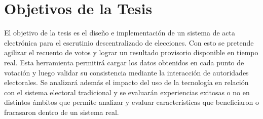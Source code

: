 \section{Objetivos de la Tesis}
El objetivo de la tesis es el diseño e implementación de un sistema de acta electrónica para el escrutinio descentralizado de elecciones. Con esto se pretende agilizar el recuento de votos y lograr un resultado provisorio disponible en tiempo real. Esta herramienta permitirá cargar los datos obtenidos en cada punto de votación y luego validar su consistencia mediante la interacción de autoridades electorales. \newline
Se analizará además el impacto del uso de la tecnología en relación con el sistema electoral tradicional y
se evaluarán experiencias exitosas o no en distintos ámbitos que permite analizar y evaluar características que beneficiaron o fracasaron dentro de un sistema real.\newline





